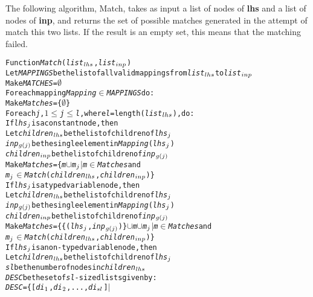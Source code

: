 The following algorithm, Match, takes as input a list of nodes of {\bf lhs}
and a list of nodes of {\bf inp}, and returns the set of possible matches
generated in the attempt of match this two lists. If the result is an empty
set, this means that the matching failed.

\begin{alltt}
   Function {\it{}Match} ({\it{}list}\(\sb{lhs}\), {\it{}list}\(\sb{inp}\))
       Let {\it{}MAPPINGS} be the list of all valid mappings from {\it{}list\(\sb{lhs}\)} to {\it{}list}\(\sb{inp}\)
       Make {\it{}MATCHES} = \(\emptyset\)
       For each mapping {\it{}Mapping} \(\in\) {\it{}MAPPINGS} do:
           Make {\it{}Matches} = \{\(\emptyset\)\}
           For each {\it{}j}, \(1\leq\){\it{}j}\(\leq\){\it{}l}, where {\it{}l}=length({\it{}list}\(\sb{lhs}\)), do: 
               If {\it{}lhs}\(\sb{j}\) is a constant node, then 
                  Let {\it{}children}\(\sb{lhs}\) be the list of children of {\it{}lhs}\(\sb{j}\) 
                      {\it{}inp}\(\sb{g(j)}\) be the single element in {\it{}Mapping}({\it{}lhs}\(\sb{j}\))
                      {\it{}children}\(\sb{inp}\) be the list of children of {\it{}inp}\(\sb{g(j)}\) 
                  Make {\it{}Matches} = \{{\it{}m}\(\cup\){\it{}m}\(\sb{j}\) \(\mid\) {\it{}m} \(\in\) {\it{}Matches} and 
                                          {\it{}m}\(\sb{j}\) \(\in\) {\it{}Match}({\it{}children}\(\sb{lhs}\), {\it{}children}\(\sb{inp}\))\}  
               If {\it{}lhs}\(\sb{j}\) is a typed variable node, then 
                  Let {\it{}children}\(\sb{lhs}\) be the list of children of {\it{}lhs}\(\sb{j}\)
                      {\it{}inp}\(\sb{g(j)}\) be the single element in {\it{}Mapping}({\it{}lhs}\(\sb{j}\))
                      {\it{}children}\(\sb{inp}\) be the list of children of {\it{}inp}\(\sb{g(j)}\)
                  Make {\it{}Matches} = \{ \{({\it{}lhs}\(\sb{j}\),{\it{}inp}\(\sb{g(j)}\))\}\(\cup\){\it{}m}\(\cup\){\it{}m}\(\sb{j}\) \(\mid\) {\it{}m} \(\in\) {\it{}Matches} and
                                         {\it{}m}\(\sb{j}\) \(\in\) {\it{}Match}({\it{}children}\(\sb{lhs}\), {\it{}children}\(\sb{inp}\)) \}
               If {\it{}lhs}\(\sb{j}\) is a non-typed variable node, then 
                  Let {\it{}children}\(\sb{lhs}\) be the list of children of {\it{}lhs}\(\sb{j}\)
                      {\it{}sl} be the number of nodes in {\it{}children}\(\sb{lhs}\)
                      {\it{}DESC} be the set of {\it{}sl}-sized lists given by:
                             {\it{}DESC} = \{[{\it{}di}\(\sb{1}\),{\it{}di}\(\sb{2}\),...,{\it{}di}\(\sb{sl}\)] \(\mid\)

\end{alltt}
